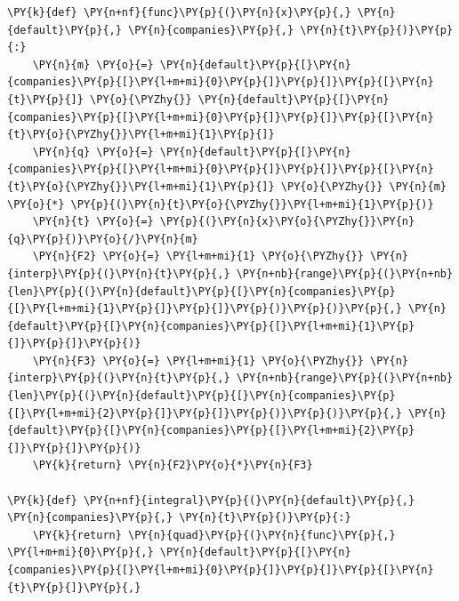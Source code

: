 \begin{tcolorbox}[breakable, size=fbox, boxrule=1pt, pad at break*=1mm,colback=cellbackground, colframe=cellborder]
\begin{Verbatim}[commandchars=\\\{\}]
\PY{k}{def} \PY{n+nf}{func}\PY{p}{(}\PY{n}{x}\PY{p}{,} \PY{n}{default}\PY{p}{,} \PY{n}{companies}\PY{p}{,} \PY{n}{t}\PY{p}{)}\PY{p}{:}
    \PY{n}{m} \PY{o}{=} \PY{n}{default}\PY{p}{[}\PY{n}{companies}\PY{p}{[}\PY{l+m+mi}{0}\PY{p}{]}\PY{p}{]}\PY{p}{[}\PY{n}{t}\PY{p}{]} \PY{o}{\PYZhy{}} \PY{n}{default}\PY{p}{[}\PY{n}{companies}\PY{p}{[}\PY{l+m+mi}{0}\PY{p}{]}\PY{p}{]}\PY{p}{[}\PY{n}{t}\PY{o}{\PYZhy{}}\PY{l+m+mi}{1}\PY{p}{]}
    \PY{n}{q} \PY{o}{=} \PY{n}{default}\PY{p}{[}\PY{n}{companies}\PY{p}{[}\PY{l+m+mi}{0}\PY{p}{]}\PY{p}{]}\PY{p}{[}\PY{n}{t}\PY{o}{\PYZhy{}}\PY{l+m+mi}{1}\PY{p}{]} \PY{o}{\PYZhy{}} \PY{n}{m} \PY{o}{*} \PY{p}{(}\PY{n}{t}\PY{o}{\PYZhy{}}\PY{l+m+mi}{1}\PY{p}{)}
    \PY{n}{t} \PY{o}{=} \PY{p}{(}\PY{n}{x}\PY{o}{\PYZhy{}}\PY{n}{q}\PY{p}{)}\PY{o}{/}\PY{n}{m}
    \PY{n}{F2} \PY{o}{=} \PY{l+m+mi}{1} \PY{o}{\PYZhy{}} \PY{n}{interp}\PY{p}{(}\PY{n}{t}\PY{p}{,} \PY{n+nb}{range}\PY{p}{(}\PY{n+nb}{len}\PY{p}{(}\PY{n}{default}\PY{p}{[}\PY{n}{companies}\PY{p}{[}\PY{l+m+mi}{1}\PY{p}{]}\PY{p}{]}\PY{p}{)}\PY{p}{)}\PY{p}{,} \PY{n}{default}\PY{p}{[}\PY{n}{companies}\PY{p}{[}\PY{l+m+mi}{1}\PY{p}{]}\PY{p}{]}\PY{p}{)}
    \PY{n}{F3} \PY{o}{=} \PY{l+m+mi}{1} \PY{o}{\PYZhy{}} \PY{n}{interp}\PY{p}{(}\PY{n}{t}\PY{p}{,} \PY{n+nb}{range}\PY{p}{(}\PY{n+nb}{len}\PY{p}{(}\PY{n}{default}\PY{p}{[}\PY{n}{companies}\PY{p}{[}\PY{l+m+mi}{2}\PY{p}{]}\PY{p}{]}\PY{p}{)}\PY{p}{)}\PY{p}{,} \PY{n}{default}\PY{p}{[}\PY{n}{companies}\PY{p}{[}\PY{l+m+mi}{2}\PY{p}{]}\PY{p}{]}\PY{p}{)}
    \PY{k}{return} \PY{n}{F2}\PY{o}{*}\PY{n}{F3}
	
\PY{k}{def} \PY{n+nf}{integral}\PY{p}{(}\PY{n}{default}\PY{p}{,} \PY{n}{companies}\PY{p}{,} \PY{n}{t}\PY{p}{)}\PY{p}{:}
    \PY{k}{return} \PY{n}{quad}\PY{p}{(}\PY{n}{func}\PY{p}{,} \PY{l+m+mi}{0}\PY{p}{,} \PY{n}{default}\PY{p}{[}\PY{n}{companies}\PY{p}{[}\PY{l+m+mi}{0}\PY{p}{]}\PY{p}{]}\PY{p}{[}\PY{n}{t}\PY{p}{]}\PY{p}{,} 


\end{Verbatim}
\end{tcolorbox}
